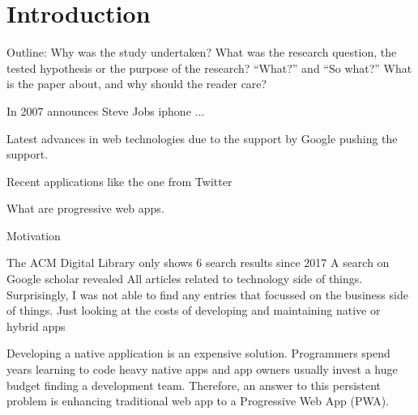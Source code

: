 \chapter{Introduction}

Outline: Why was the study undertaken?
What was the research question, the tested hypothesis or the purpose of the research?
“What?” and “So what?” What is the paper
about, and why should the reader care?

In 2007 announces Steve Jobs iphone ...

Latest advances in web technologies due to the support by Google pushing the support.

Recent applications like the one from Twitter

What are progressive web apps.

Motivation
\cite{liebelProgressiveWebApps2019}

The ACM Digital Library only shows 6 search results since 2017
A search on Google scholar revealed All articles related to technology side of things. Surprisingly, I was not able to find any entries that focussed on the business side of things. Just looking at the costs of developing and maintaining native or hybrid apps

Developing a native application is an expensive solution. Programmers spend years learning to code heavy native apps and app owners usually invest a huge budget finding a development team. Therefore, an answer to this persistent problem is enhancing traditional web app to a Progressive Web App (PWA). \citep{nguyen2019progressive}
